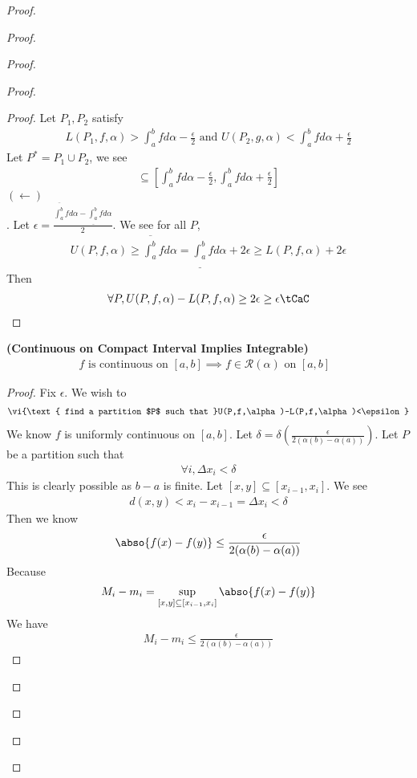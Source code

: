 \documentclass{report}
\begin{document}
\begin{proof}
\begin{proof}
\begin{proof}
\begin{proof}
\begin{proof}
Let $P_1,P_2$ satisfy 
 \begin{align*}
L(P_1,f,\alpha )>\int_a^b fd\alpha -\frac{\epsilon}{2}\text{ and }U(P_2,g,\alpha )<\int_a^b fd\alpha +\frac{\epsilon}{2}
\end{align*}
Let $P^*=P_1\cup  P_2$, we see 
\begin{align*}
[L(P^*,f,\alpha ),U(P^*,f,\alpha )] \subseteq [\int_a^b fd\alpha -\frac{\epsilon}{2},\int_a^b fd\alpha +\frac{\epsilon}{2}]
\end{align*}
$(\longleftarrow)$\\

. Let $\epsilon = \frac{\overline{\int_a^b}fd\alpha - \underline{\int_a^b}fd\alpha }{2}$. We see for all $P$, 
 \begin{align*}
U(P,f,\alpha )\geq \overline{\int_a^b}fd\alpha=\underline{\int_a^b}fd\alpha +2\epsilon \geq L(P,f,\alpha )+2\epsilon 
\end{align*}
Then 
\begin{align*}
\forall P,U(P,f,\alpha )-L(P,f,\alpha )\geq 2\epsilon \geq \epsilon \tCaC
\end{align*}
\end{proof}
\begin{theorem}
\label{7.1.15}
\textbf{(Continuous on Compact Interval Implies Integrable)} 
\begin{align*}
f\text{ is continuous on }[a,b]\implies f\in \mathscr{R}(\alpha )\text{ on $[a,b]$ }
\end{align*}
\end{theorem}
\begin{proof}
Fix $\epsilon $. We wish to  
\begin{align*}
  \vi{\text{ find a partition $P$ such that }U(P,f,\alpha )-L(P,f,\alpha )<\epsilon}
\end{align*}
We know $f$ is uniformly continuous on $[a,b]$. Let  $\delta=\delta( \frac{\epsilon }{2(\alpha (b)-\alpha (a))})$. Let $P$ be a partition such that 
\begin{align*}
\forall i, \Delta x_i<\delta
\end{align*}
This is clearly possible as $b-a$ is finite. Let $[x,y]\subseteq [x_{i-1},x_i]$. We see 
\begin{align*}
d(x,y)<x_i-x_{i-1}=\Delta x_i<\delta
\end{align*}
Then we know  
\begin{align*}
\abso{f(x)-f(y)}\leq \frac{\epsilon }{2(\alpha (b)-\alpha (a))}
\end{align*}
Because 
 \begin{align*}
M_i-m_i=\sup_{[x,y]\subseteq [x_{i-1},x_i]} \abso{f(x)-f(y)}
\end{align*}
We have 
\begin{align*}
M_i-m_i\leq \frac{\epsilon }{2(\alpha (b)-\alpha (a))}
\end{align*}



\end{proof}
\end{proof}
\end{proof}
\end{proof}
\end{proof}
\end{document}

